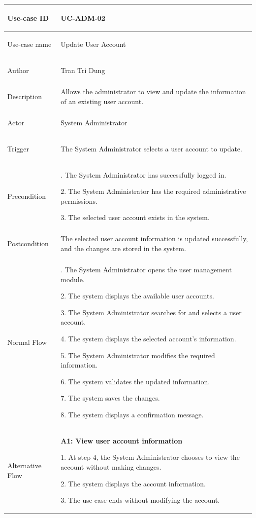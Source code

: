 \begin{longtable}{|>{\bfseries\raggedright\arraybackslash}p{}|>{\raggedright\arraybackslash}p{}|}
\hline
Use-case ID & UC-ADM-02 \\ \hline
Use-case name & Update User Account \\ \hline
Author & Tran Tri Dung \\ \hline
Description & Allows the administrator to view and update the information of an existing user account. \\ \hline
Actor & System Administrator \\ \hline
Trigger & The System Administrator selects a user account to update. \\ \hline
Precondition &
1. The System Administrator has successfully logged in. \par
2. The System Administrator has the required administrative permissions. \par
3. The selected user account exists in the system. \\ \hline
Postcondition & The selected user account information is updated successfully, and the changes are stored in the system. \\ \hline
Normal Flow &
1. The System Administrator opens the user management module. \par
2. The system displays the available user accounts. \par
3. The System Administrator searches for and selects a user account. \par
4. The system displays the selected account's information. \par
5. The System Administrator modifies the required information. \par
6. The system validates the updated information. \par
7. The system saves the changes. \par
8. The system displays a confirmation message. \\ \hline
Alternative Flow &
\textbf{A1: View user account information} \par
1. At step 4, the System Administrator chooses to view the account without making changes. \par
2. The system displays the account information. \par
3. The use case ends without modifying the account. \\ \hline

\end{longtable}
